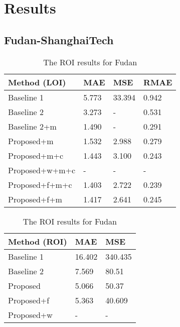 \chapter{Results}

\section{Fudan-ShanghaiTech}

\begin{table}[!htb]
	\begin{minipage}{.5\linewidth}
      \centering
		\begin{tabular}{llll}
		\hline
		Method (LOI)                               & MAE & MSE & RMAE \\ \hline
		\multicolumn{1}{l|}{Baseline 1}          & 5.773 & 33.394 & 0.942 \\
		\multicolumn{1}{l|}{Baseline 2}          & 3.273 & - & 0.531 \\
		\multicolumn{1}{l|}{Baseline 2+m}        & 1.490 & - & 0.291 \\
		\multicolumn{1}{l|}{Proposed+m}        	 &  1.532 & 2.988 & 0.279 \\
		\multicolumn{1}{l|}{Proposed+m+c}        &  1.443 & 3.100 & 0.243 \\
		\multicolumn{1}{l|}{Proposed+w+m+c}        & - & - & - \\
		\multicolumn{1}{l|}{Proposed+f+m+c}        & 1.403 & 2.722 & 0.239 \\
		\multicolumn{1}{l|}{Proposed+f+m} & 1.417 & 2.641 & 0.245 \\ \hline
		\end{tabular}
		\caption{\label{tab:loi_fudan}The LOI results for Fudan}
	\end{minipage}
	\begin{minipage}{.5\linewidth}
      \centering
		\begin{tabular}{lll}
		\hline
		Method (ROI)                               & MAE & MSE \\ \hline
		\multicolumn{1}{l|}{Baseline 1}          & 16.402 & 340.435 \\
		\multicolumn{1}{l|}{Baseline 2}          & 7.569 & 80.51 \\
		\multicolumn{1}{l|}{Proposed}        	 & 5.066 & 50.37 \\
		\multicolumn{1}{l|}{Proposed+f} 		 & 5.363 & 40.609 \\
		\multicolumn{1}{l|}{Proposed+w} 		 & - & - \\ \hline
		\end{tabular}
		\caption{\label{tab:roi_fudan}The ROI results for Fudan}
	\end{minipage}
\end{table}

